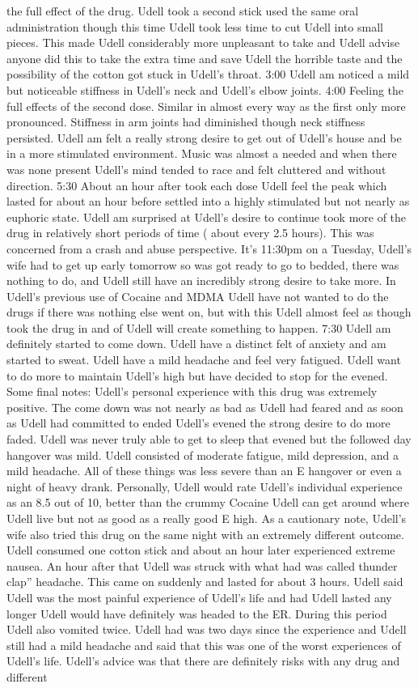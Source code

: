 \documentclass[12pt]{book}
\begin{document}
the full effect of the drug. Udell took a second stick used the same oral administration though this time Udell took less time to cut Udell into small pieces. This made Udell considerably more unpleasant to take and Udell advise anyone did this to take the extra time and save Udell the horrible taste and the possibility of the cotton got stuck in Udell's throat. 3:00 Udell am noticed a mild but noticeable stiffness in Udell's neck and Udell's elbow joints. 4:00 Feeling the full effects of the second dose. Similar in almost every way as the first only more pronounced. Stiffness in arm joints had diminished though neck stiffness persisted. Udell am felt a really strong desire to get out of Udell's house and be in a more stimulated environment. Music was almost a needed and when there was none present Udell's mind tended to race and felt cluttered and without direction. 5:30 About an hour after took each dose Udell feel the peak which lasted for about an hour before settled into a highly stimulated but not nearly as euphoric state. Udell am surprised at Udell's desire to continue took more of the drug in relatively short periods of time ( about every 2.5 hours). This was concerned from a crash and abuse perspective. It's 11:30pm on a Tuesday, Udell's wife had to get up early tomorrow so was got ready to go to bedded, there was nothing to do, and Udell still have an incredibly strong desire to take more. In Udell's previous use of Cocaine and MDMA Udell have not wanted to do the drugs if there was nothing else went on, but with this Udell almost feel as though took the drug in and of Udell will create something to happen. 7:30 Udell am definitely started to come down. Udell have a distinct felt of anxiety and am started to sweat. Udell have a mild headache and feel very fatigued. Udell want to do more to maintain Udell's high but have decided to stop for the evened. Some final notes: Udell's personal experience with this drug was extremely positive. The come down was not nearly as bad as Udell had feared and as soon as Udell had committed to ended Udell's evened the strong desire to do more faded. Udell was never truly able to get to sleep that evened but the followed day hangover was mild. Udell consisted of moderate fatigue, mild depression, and a mild headache. All of these things was less severe than an E hangover or even a night of heavy drank. Personally, Udell would rate Udell's individual experience as an 8.5 out of 10, better than the crummy Cocaine Udell can get around where Udell live but not as good as a really good E high. As a cautionary note, Udell's wife also tried this drug on the same night with an extremely different outcome. Udell consumed one cotton stick and about an hour later experienced extreme nausea. An hour after that Udell was struck with what had was called thunder clap'' headache. This came on suddenly and lasted for about 3 hours. Udell said Udell was the most painful experience of Udell's life and had Udell lasted any longer Udell would have definitely was headed to the ER. During this period Udell also vomited twice. Udell had was two days since the experience and Udell still had a mild headache and said that this was one of the worst experiences of Udell's life. Udell's advice was that there are definitely risks with any drug and different 
\end{document}
